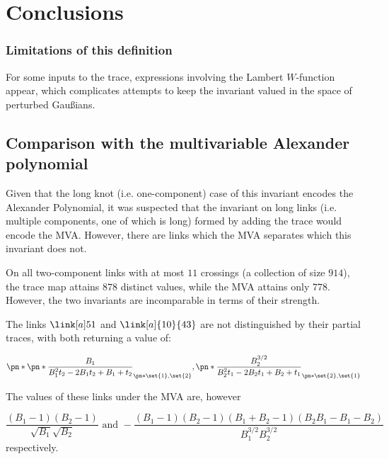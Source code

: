 \chapter{Conclusions}\label{ch:conclusions}

\subsection{Limitations of this definition}\label{sec:limitations}
For some inputs to the trace, expressions involving the Lambert $W$-function
appear, which complicates attempts to keep the invariant valued in the space of
perturbed Gaußians.

\section{Comparison with the multivariable Alexander polynomial}

Given that the long knot (i.e. one-component) case of this invariant
encodes the Alexander Polynomial, it was suspected that the invariant on long
links (i.e. multiple components, one of which is long) formed by adding the
trace would encode the \ac{MVA}. However, there are links which the \ac{MVA}
separates which this invariant does not.

On all two-component links with at most $11$ crossings (a collection of size
$914$), the trace map attains $878$ distinct values, while the MVA attains only
$778$. However, the two invariants are incomparable in terms of their strength.

The links $\link[a]51$ and $\link[a]{10}{43}$ are not distinguished by their
partial traces, with both returning a value of:

\begin{equation}
        \pn*{
                \pn*{
                        \frac{B_1}{B_1^2 t_2 -2 B_1 t_2 +B_1+t_2}
                }_{\pn*{\set{1},\set{2}}},
                \pn*{
                        \frac{B_2^{3/2}}{B_2^2 t_1 -2 B_2 t_1 +B_2+t_1}
                }_{\pn*{\set{2},\set{1}}}
}
\end{equation}

The values of these links under the \ac{MVA} are, however

\begin{equation}
        \frac{\left(B_1-1\right) \left(B_2-1\right)}{\sqrt{B_1} \sqrt{B_2}}
        \text{ and }
        -\frac{\left(B_1-1\right) \left(B_2-1\right) \left(B_1+B_2-1\right)
        \left(B_2 B_1-B_1-B_2\right)}{B_1^{3/2} B_2^{3/2}}
\end{equation}
respectively.

